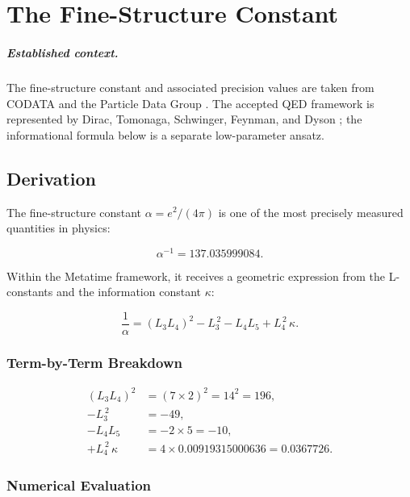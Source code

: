 \chapter{The Fine-Structure Constant}
\label{ch:fine_structure}


\paragraph{Established context.}
The fine-structure constant and associated precision values are taken from
CODATA and the Particle Data Group \cite{CODATA2022,PDG2024}.  The accepted QED
framework is represented by Dirac, Tomonaga, Schwinger, Feynman, and Dyson
\cite{Dirac1928,Tomonaga1946,Schwinger1948,Feynman1949,Dyson1949}; the informational
formula below is a separate low-parameter ansatz.

\section{Derivation}

The fine-structure constant \(\alpha = e^2/(4\pi)\) is one of the most
precisely measured quantities in physics:

\[
\alpha^{-1} = 137.035999084.
\]

Within the Metatime framework, it receives a geometric expression from the
L-constants and the information constant \(\kappa\):

\begin{equation}
\frac{1}{\alpha} = (L_3 L_4)^2 - L_3^{\,2} - L_4 L_5 + L_4^{\,2}\,\kappa.
\label{eq:alpha_derived}
\end{equation}

\subsection{Term-by-Term Breakdown}

\[
\begin{aligned}
(L_3 L_4)^2 &= (7 \times 2)^2 = 14^2 = 196, \\
- L_3^{\,2} &= -49, \\
- L_4 L_5 &= -2 \times 5 = -10, \\
+ L_4^{\,2}\,\kappa &= 4 \times 0.00919315000636 = 0.0367726.
\end{aligned}
\]

\subsection{Numerical Evaluation}


